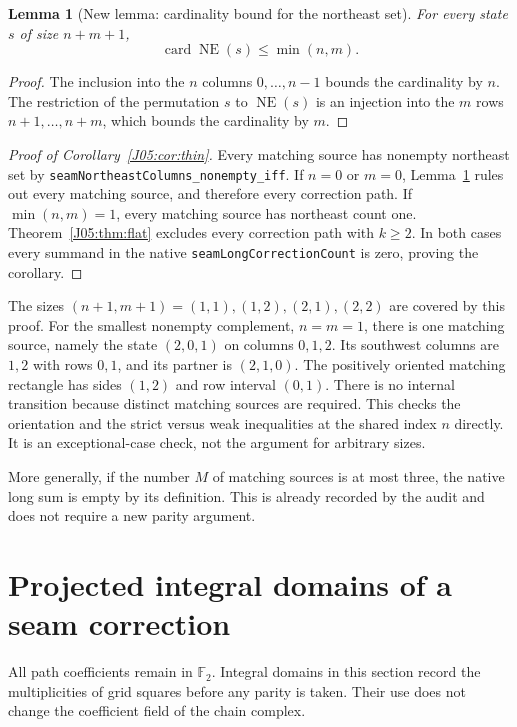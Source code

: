 \documentclass[11pt,oneside]{report}
\newtheorem{lemma}[theorem]{Lemma}
\theoremstyle{definition}
\numberwithin{equation}{section}
\newcommand{\decl}[1]{\textnormal{\nolinkurl{#1}}}
\newcommand{\NE}{\operatorname{NE}}
\newcommand{\seamcardop}{\operatorname{card}}
\begin{document}
\begin{lemma}[New lemma: cardinality bound for the northeast set]
\label{J05:lem:countbound}
For every state $s$ of size $n+m+1$,
\[
 \seamcardop\NE(s)\leq\min(n,m).
\]
\end{lemma}
\begin{proof}
The inclusion into the $n$ columns $0,\ldots,n-1$ bounds the cardinality by
$n$. The restriction of the permutation $s$ to $\NE(s)$ is an injection into
the $m$ rows $n+1,\ldots,n+m$, which bounds the cardinality by $m$.
\end{proof}

\begin{proof}[Proof of Corollary~\ref{J05:cor:thin}]
Every matching source has nonempty northeast set by
\decl{seamNortheastColumns_nonempty_iff}. If $n=0$ or $m=0$,
Lemma~\ref{J05:lem:countbound} rules out every matching source, and therefore
every correction path. If $\min(n,m)=1$, every matching source has northeast
count one. Theorem~\ref{J05:thm:flat} excludes every correction path with
$k\geq2$. In both cases every summand in the native
\decl{seamLongCorrectionCount} is zero, proving the corollary.
\end{proof}

The sizes $(n+1,m+1)=(1,1),(1,2),(2,1),(2,2)$ are covered by this proof.
For the smallest nonempty complement, $n=m=1$, there is one matching source,
namely the state $(2,0,1)$ on columns $0,1,2$. Its southwest columns are
$1,2$ with rows $0,1$, and its partner is $(2,1,0)$. The positively oriented
matching rectangle has sides $(1,2)$ and row interval $(0,1)$.
There is no internal transition because distinct matching sources are
required. This checks the orientation and the strict versus weak inequalities
at the shared index $n$ directly. It is an exceptional-case check, not the
argument for arbitrary sizes.

More generally, if the number $M$ of matching sources is at most three, the
native long sum is empty by its definition. This is already recorded by the
audit and does not require a new parity argument.

\section{Projected integral domains of a seam correction}

All path coefficients remain in $\mathbb F_2$. Integral domains in this
section record the multiplicities of grid squares before any parity is
taken. Their use does not change the coefficient field of the chain
complex.
\end{document}

